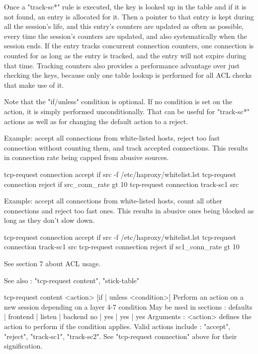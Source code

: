         Once a "track-sc*" rule is executed, the key is looked up in the table
        and if it is not found, an entry is allocated for it. Then a pointer to
        that entry is kept during all the session's life, and this entry's
        counters are updated as often as possible, every time the session's
        counters are updated, and also systematically when the session ends.
        If the entry tracks concurrent connection counters, one connection is
        counted for as long as the entry is tracked, and the entry will not
        expire during that time. Tracking counters also provides a performance
        advantage over just checking the keys, because only one table lookup is
        performed for all ACL checks that make use of it.

  Note that the "if/unless" condition is optional. If no condition is set on
  the action, it is simply performed unconditionally. That can be useful for
  "track-sc*" actions as well as for changing the default action to a reject.

  Example: accept all connections from white-listed hosts, reject too fast
           connection without counting them, and track accepted connections.
           This results in connection rate being capped from abusive sources.

        tcp-request connection accept if { src -f /etc/haproxy/whitelist.lst }
        tcp-request connection reject if { src_conn_rate gt 10 }
        tcp-request connection track-sc1 src

  Example: accept all connections from white-listed hosts, count all other
           connections and reject too fast ones. This results in abusive ones
           being blocked as long as they don't slow down.

        tcp-request connection accept if { src -f /etc/haproxy/whitelist.lst }
        tcp-request connection track-sc1 src
        tcp-request connection reject if { sc1_conn_rate gt 10 }

  See section 7 about ACL usage.

  See also : "tcp-request content", "stick-table"


tcp-request content <action> [{if | unless} <condition>]
  Perform an action on a new session depending on a layer 4-7 condition
  May be used in sections :   defaults | frontend | listen | backend
                                 no    |    yes   |   yes  |   yes
  Arguments :
    <action>    defines the action to perform if the condition applies. Valid
                actions include : "accept", "reject", "track-sc1", "track-sc2".
                See "tcp-request connection" above for their signification.

